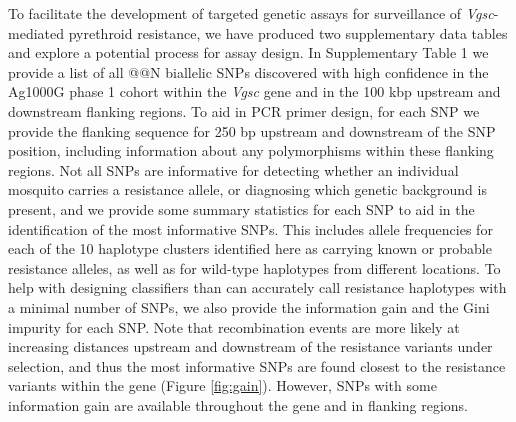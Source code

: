 \documentclass[a4paper,11pt,abstracton,hidelinks]{scrartcl}
\begin{document}
%
To facilitate the development of targeted genetic assays for surveillance of \textit{Vgsc}-mediated pyrethroid resistance, we have produced two supplementary data tables and explore a potential process for assay design.
%
In Supplementary Table 1 we provide a list of all @@N biallelic SNPs discovered with high confidence in the Ag1000G phase 1 cohort within the \textit{Vgsc} gene and in the 100 kbp upstream and downstream flanking regions.
%
To aid in PCR primer design, for each SNP we provide the flanking sequence for 250 bp upstream and downstream of the SNP position, including information about any polymorphisms within these flanking regions.
%
Not all SNPs are informative for detecting whether an individual mosquito carries a resistance allele, or diagnosing which genetic background is present, and we provide some summary statistics for each SNP to aid in the identification of the most informative SNPs.
%
This includes allele frequencies for each of the 10 haplotype clusters identified here as carrying known or probable resistance alleles, as well as for wild-type haplotypes from different locations.
%
To help with designing classifiers than can accurately call resistance haplotypes with a minimal number of SNPs, we also provide the information gain \cite{Quinlan1986} and the Gini impurity \cite{Breiman1984} for each SNP.
%
Note that recombination events are more likely at increasing distances upstream and downstream of the resistance variants under selection, and thus the most informative SNPs are found closest to the resistance variants within the gene (Figure \ref{fig:gain}).
%
However, SNPs with some information gain are available throughout the gene and in flanking regions.
%
\end{document}
